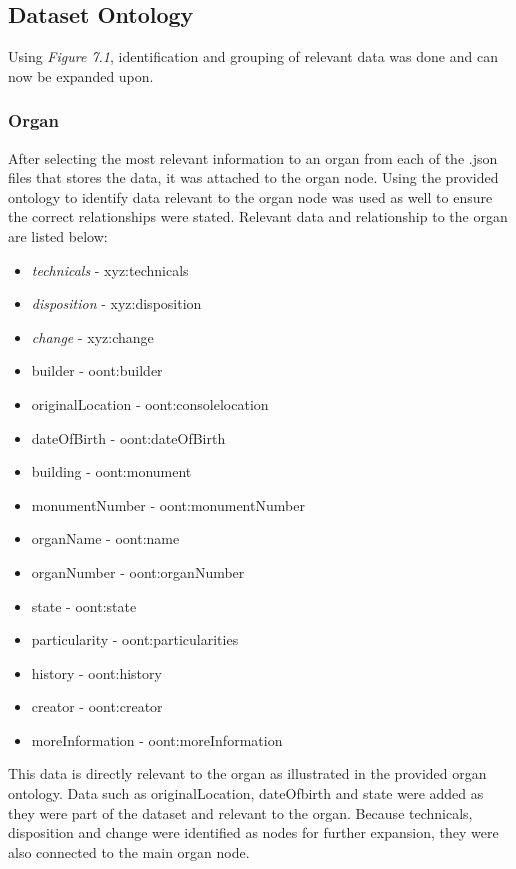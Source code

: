 \subsection{Dataset Ontology}
\hspace*{0.5cm} Using \textit{Figure 7.1}, identification and grouping of relevant data was done and can now be expanded upon. 

\subsubsection{Organ}
\hspace*{0.5cm} After selecting the most relevant information to an organ from each of the .json files that stores the data, it was attached to the organ node. Using the provided ontology to identify data relevant to the organ node was used as well to ensure the correct relationships were stated. Relevant data and relationship to the organ are listed below:

\vspace{-0.1cm}
\begin{itemize}
    \itemsep0em 
    \item \textit{technicals} - xyz:technicals
    \item \textit{disposition} - xyz:disposition
    \item \textit{change} - xyz:change
    \item builder - oont:builder
    \item originalLocation - oont:consolelocation
    \item dateOfBirth - oont:dateOfBirth
    \item building - oont:monument
    \item monumentNumber - oont:monumentNumber
    \item organName - oont:name
    \item organNumber - oont:organNumber 
    \item state - oont:state 
    \item particularity - oont:particularities
    \item history - oont:history
    \item creator - oont:creator
    \item moreInformation - oont:moreInformation 
\end{itemize}

This data is directly relevant to the organ as illustrated in the provided organ ontology. Data such as originalLocation, dateOfbirth and state were added as they were part of the dataset and relevant to the organ. Because technicals, disposition and change were identified as nodes for further expansion, they were also connected to the main organ node. 

